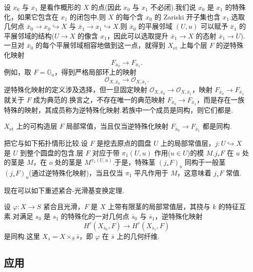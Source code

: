 设 $x_0$ 与 $x_1$ 是看作概形的 $X$ 的点(因此 $x_0$ 与 $x_1$ 不必闭).我们说 $x_0$ 是 $x_1$ 的特殊化，如果它包含在 $x_1$ 的闭包中.则 $X$ 的每个含 $x_0$ 的 Zariski 开子集也含 $x_1$.选取几何点 $\bar{x}_0 \to x_0 \hookrightarrow X$ 与 $\bar{x}_1 \to x_1 \hookrightarrow X$.则 $\bar{x}_0$ 的平展邻域 $(U, u)$ 可以赋予 $\bar{x}_1$ 的平展邻域的结构($U \to X$ 的像含 $x_1$，因此可以选取提升 $\bar{x}_1 \to X$ 的态射 $\bar{x}_1 \to U$).一旦对 $\bar{x}_0$ 的每个平展邻域相容地做到这一点，就得到 $X_{\mathrm{et}}$ 上每个层 $F$ 的逆特殊化映射
\[
F_{\bar{x}_0} \to F_{\bar{x}_1}.
\]
例如，取 $F = \mathbb{G}_{a}$，得到严格局部环上的映射
\[
\mathcal{O}_{X, \bar{x}_0} \to \mathcal{O}_{X, \bar{x}_1}.
\]
逆特殊化映射的定义涉及选择，但一旦固定映射 $\mathcal{O}_{X, \bar{x}_0} \to \mathcal{O}_{X, \bar{x}_1}$，映射 $F_{\bar{x}_0} \to F_{\bar{x}_1}$ 就关于 $F$ 成为典范的.换言之，不存在唯一的典范映射 $F_{\bar{x}_0} \to F_{\bar{x}_1}$，而是存在一族特殊的映射，其成员称为逆特殊化映射.若族中一个成员是同构，则它们都是.

\begin{proposition}\label{prop:20.3}
$X_{\mathrm{et}}$ 上的可构造层 $F$ 局部常值，当且仅当逆特殊化映射 $F_{\bar{x}_0} \to F_{\bar{x}_1}$ 都是同构.
\end{proposition}

把它与如下拓扑情形比较.设 $F$ 是挖去原点的圆盘 $U$ 上的局部常值层，$j \colon U \hookrightarrow X$ 是 $U$ 到整个圆盘的包含.层 $F$ 对应于带 $\pi_1(U, u)$ 作用($u \in U$)的模 $M$.$j_{*}F$ 在 $u$ 处的茎是 $M$，在 $o$ 处的茎是 $M^{\pi_1(U,u)}$.于是，特殊茎 $(j_{*}F)_o$ 同构于一般茎 $(j_{*}F)_u$(通过逆特殊化映射)，当且仅当 $\pi_1$ 平凡作用于 $M$，这意味着 $j_{*}F$ 常值.

现在可以如下重述紧合-光滑基变换定理.

\begin{theorem}\label{thm:20.4}
设 $\varphi \colon X \to S$ 紧合且光滑，$F$ 是 $X$ 上带有限茎的局部常值层，其挠与 $k$ 的特征互素.对满足 $s_0$ 是 $s_1$ 的特殊化的一对几何点 $\bar{s}_0$ 与 $\bar{s}_1$，逆特殊化映射
\[
H^{r}(X_{\bar{s}_0}, F) \to H^{r}(X_{\bar{s}_1}, F)
\]
是同构.这里 $X_{\bar{s}} = X \times_{S} \bar{s}$，即 $\varphi$ 在 $\bar{s}$ 上的几何纤维.
\end{theorem}

\subsection*{应用}

